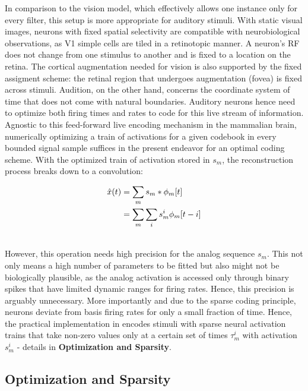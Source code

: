 \documentclass[
	a4paper, %
	11pt, %
	unnumberedsections, %
]{LTJournalArticle}
\begin{document}
In comparison to the vision model, which effectively allows one instance only for every filter, this setup is more appropriate for auditory stimuli. With static visual images, neurons with fixed spatial selectivity are compatible with neurobiological observations, as V1 simple cells are tiled in a retinotopic manner. A neuron's RF does not change from one stimulus to another and is fixed to a location on the retina. The cortical augmentation needed for vision is also supported by the fixed assigment scheme: the retinal region that undergoes augmentation (fovea) is fixed across stimuli. Audition, on the other hand, concerns the coordinate system of time that does not come with natural boundaries. Auditory neurons hence need to optimize both firing times and rates to code for this live stream of information. Agnostic to this feed-forward live encoding mechanism in the mammalian brain, numerically optimizing a train of activations for a given codebook in every bounded signal sample suffices in the present endeavor for an optimal coding scheme. With the optimized train of activation stored in $s_m$, the reconstruction process breaks down to a convolution: 
\begin{center}
  \begin{align}
    \hat{x}(t)  & = \sum_m s_m * \phi_m[t]\label{Eq4}\\
    & = \sum_m \sum_i s_m^i \phi_m[t - i]\notag
  \end{align}
\end{center}
\\
 However, this operation needs high precision for the analog sequence $s_m$. This not only means a high number of parameters to be fitted but also might not be biologically plausible, as the analog activation is accessed only through binary spikes that have limited dynamic ranges for firing rates. Hence, this precision is arguably unnecessary. More importantly and due to the sparse coding principle, neurons deviate from basis firing rates for only a small fraction of time. Hence, the practical implementation in \textcite{smithEfficientAuditoryCoding2006} encodes stimuli with sparse neural activation trains that take non-zero values only at a certain set of times $\tau_m^i$ with activation $s_m^i$ - details in \textbf{Optimization and Sparsity}.

\subsection{Optimization and Sparsity} 
  \label{sub:constraints}
\end{document}
